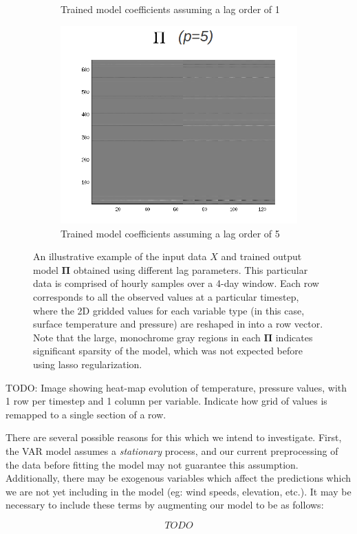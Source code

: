 \documentclass{article} %
\newcommand{\bs}{\boldsymbol}
\newcommand{\VARdata}{X}
\newcommand{\VARmodel}{\bs{\Pi}}
\begin{document}
\begin{figure}
\begin{subfigure}{0.2\textwidth}
	\caption{Trained model coefficients assuming a lag order of 1}
\end{subfigure}
\begin{subfigure}{0.6\textwidth}
	\includegraphics[width=1.0\textwidth]{./var_params_lag_5.png}
	\caption{Trained model coefficients assuming a lag order of 5}
\end{subfigure}
\caption{An illustrative example of the input data $\VARdata$ and trained output model $\VARmodel$ obtained using different lag parameters. This particular data is comprised of hourly samples over a 4-day window. Each row corresponds to all the observed values at a particular timestep, where the 2D gridded values for each variable type (in this case, surface temperature and pressure) are reshaped in into a row vector. Note that the large, monochrome gray regions in each $\VARmodel$ indicates significant sparsity of the model, which was not expected before using lasso regularization. }
\label{fig:var_data_example}
\end{figure}

TODO: Image showing heat-map evolution of temperature, pressure values, with 1 row per timestep and 1 column per variable. Indicate how grid of values is remapped to a single section of a row.

There are several possible reasons for this which we intend to investigate. First, the VAR model assumes a \emph{stationary} process, and our current preprocessing of the data before fitting the model may not guarantee this assumption. Additionally, there may be exogenous variables which affect the predictions which we are not yet including in the model (eg: wind speeds, elevation, etc.). It may be necessary to include these terms by augmenting our model to be as follows:

\begin{equation}
TODO
\end{equation}



\end{document}
